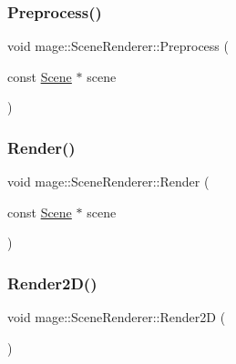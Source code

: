 \hypertarget{classmage_1_1_scene_renderer_afd9631ea4c3b1ec7b188c06ba01f1dfe}{}\label{classmage_1_1_scene_renderer_afd9631ea4c3b1ec7b188c06ba01f1dfe} 
\subsubsection{\texorpdfstring{Preprocess()}{Preprocess()}}
{\footnotesize\ttfamily void mage\+::\+Scene\+Renderer\+::\+Preprocess (\begin{DoxyParamCaption}\item[{const \hyperlink{classmage_1_1_scene}{Scene} $\ast$}]{scene }\end{DoxyParamCaption})\hspace{0.3cm}{\ttfamily [private]}}

\hypertarget{classmage_1_1_scene_renderer_aa7825b36b1c9e0d22cbd49a9df5e73e4}{}\label{classmage_1_1_scene_renderer_aa7825b36b1c9e0d22cbd49a9df5e73e4} 
\subsubsection{\texorpdfstring{Render()}{Render()}}
{\footnotesize\ttfamily void mage\+::\+Scene\+Renderer\+::\+Render (\begin{DoxyParamCaption}\item[{const \hyperlink{classmage_1_1_scene}{Scene} $\ast$}]{scene }\end{DoxyParamCaption})}

\hypertarget{classmage_1_1_scene_renderer_a492e9395bc559180023758bb26e9e678}{}\label{classmage_1_1_scene_renderer_a492e9395bc559180023758bb26e9e678} 
\subsubsection{\texorpdfstring{Render2\+D()}{Render2D()}}
{\footnotesize\ttfamily void mage\+::\+Scene\+Renderer\+::\+Render2D (\begin{DoxyParamCaption}{ }\end{DoxyParamCaption})\hspace{0.3cm}{\ttfamily [private]}}

